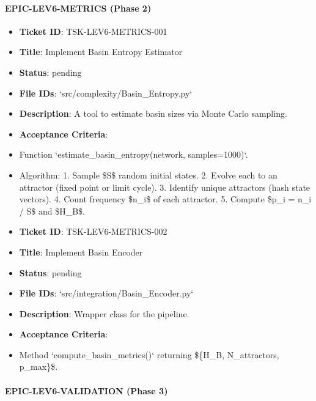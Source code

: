 \documentclass{article}
\begin{document}
\paragraph{EPIC-LEV6-METRICS (Phase 2)}

\begin{itemize}
\item   \textbf{Ticket ID}: TSK-LEV6-METRICS-001
\item   \textbf{Title}: Implement Basin Entropy Estimator
\item   \textbf{Status}: pending
\item   \textbf{File IDs}: `src/complexity/Basin\_Entropy.py`
\item   \textbf{Description}: A tool to estimate basin sizes via Monte Carlo sampling.
\item   \textbf{Acceptance Criteria}:
\item   Function `estimate\_basin\_entropy(network, samples=1000)`.
\item   Algorithm:
            1.  Sample \$S\$ random initial states.
            2.  Evolve each to an attractor (fixed point or limit cycle).
            3.  Identify unique attractors (hash state vectors).
            4.  Count frequency \$n\_i\$ of each attractor.
            5.  Compute \$p\_i = n\_i / S\$ and \$H\_B\$.
\end{itemize}

\begin{itemize}
\item   \textbf{Ticket ID}: TSK-LEV6-METRICS-002
\item   \textbf{Title}: Implement Basin Encoder
\item   \textbf{Status}: pending
\item   \textbf{File IDs}: `src/integration/Basin\_Encoder.py`
\item   \textbf{Description}: Wrapper class for the pipeline.
\item   \textbf{Acceptance Criteria}:
\item   Method `compute\_basin\_metrics()` returning \$\{H\_B, N\_{attractors}, p\_{max}\}\$.
\end{itemize}

\paragraph{EPIC-LEV6-VALIDATION (Phase 3)}
\end{document}
